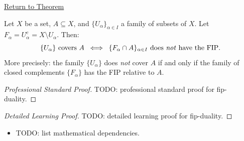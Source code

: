 \newpage
{}
\label{prf:fip-duality}

\begin{remark*}[Return]
\hyperref[prop:fip-duality]{Return to Theorem}
\end{remark*}

\begin{theorem*}
Let $X$ be a set, $A \subseteq X$, and $\{U_\alpha\}_{\alpha \in I}$ a
family of subsets of $X$. Let $F_\alpha = U_\alpha^c = X \setminus U_\alpha$.
Then:
\[
\{U_\alpha\} \text{ covers } A
\;\;\Longleftrightarrow\;\;
\{F_\alpha \cap A\}_{\alpha \in I} \text{ does \emph{not} have the FIP}.
\]
More precisely: the family $\{U_\alpha\}$ does \emph{not} cover $A$ if and
only if the family of closed complements $\{F_\alpha\}$ has the FIP relative
to $A$.
\end{theorem*}

\begin{proof}[Professional Standard Proof]
\LRAProofBodyStart
TODO: professional standard proof for fip-duality.
\end{proof}

\begin{proof}[Detailed Learning Proof]
\LRAProofBodyStart
TODO: detailed learning proof for fip-duality.
\end{proof}

\begin{remark*}
\end{remark*}

\begin{dependencies}
\begin{itemize}
  \item TODO: list mathematical dependencies.
\end{itemize}
\end{dependencies}

\clearpage
